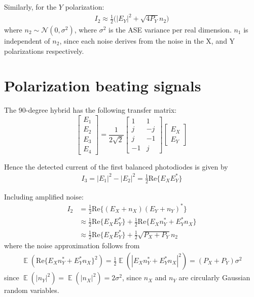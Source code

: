 \documentclass[a4paper]{article}
\DeclareMathOperator{\E}{\mathbb{E}}
\begin{document}
Similarly, for the $Y$ polarization:
\begin{align} \nonumber
I_2 \approx \frac{1}{2}\Big(|E_Y|^2 + \sqrt{4P_Y}n_2\Big)
\end{align}
where $n_2 \sim\mathcal{N}(0, \sigma^2)$, where $\sigma^2$ is the ASE variance per real dimension. $n_1$ is independent of $n_2$, since each noise derives from the noise in the X, and Y polarizations respectively.

\section{Polarization beating signals}

The 90-degree hybrid has the following transfer matrix:
\begin{equation}
\begin{bmatrix}
E_1 \\
E_2 \\
E_3 \\
E_4 
\end{bmatrix} = \frac{1}{2\sqrt{2}}\begin{bmatrix}
1 & 1 \\
j & -j \\
j & -1 \\
-1 & j 
\end{bmatrix}\begin{bmatrix}
E_X \\
E_Y
\end{bmatrix}
\end{equation}

Hence the detected current of the first balanced photodiodes is given by
\begin{align}
I_3 = |E_1|^2 - |E_2|^2 = \frac{1}{2}\mathrm{Re}\{E_XE_Y^*\}
\end{align}

Including amplified noise:
\begin{align} \nonumber
I_2 &= \frac{1}{2}\mathrm{Re}\{(E_X + n_X)(E_Y + n_Y)^*\} \\ \nonumber
&\approx \frac{1}{2}\mathrm{Re}\{E_XE_Y^*\} + \frac{1}{2}\mathrm{Re}\{E_Xn_Y^* + E_Y^*n_X\} \\
&\approx \frac{1}{2}\mathrm{Re}\{E_XE_Y^*\} + \frac{1}{2}\sqrt{P_X + P_Y}n_2
\end{align}
where the noise approximation follows from
\begin{align}
\E(\mathrm{Re}\{E_Xn_Y^* + E_Y^*n_X\}^2) = \frac{1}{2}\E(|E_Xn_Y^* + E_Y^*n_X|^2) = (P_X + P_Y)\sigma^2
\end{align}
since $\E(|n_Y|^2) = \E(|n_X|^2) = 2\sigma^2$, since $n_X$ and $n_Y$ are circularly Gaussian random variables.
\end{document}
